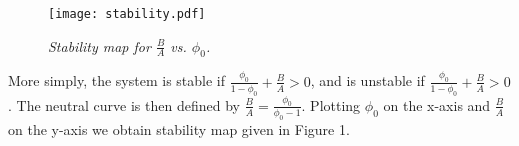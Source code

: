\documentclass[9pt,fleqn,twoside]{article}
\theoremstyle{plain}
\theoremstyle{definition}
\theoremstyle{remark}
\begin{document}
\begin{figure}[!htbp]
\centering
\scalebox{0.5} 
{\texttt{[image: stability.pdf]}} 
\caption{\small {\it Stability map for $\frac{B}{A}$ vs. $\phi_0$.}} 
\end{figure}
More simply, the system is stable if $\frac{\phi_0}{1-\phi_0} +
\frac{B}{A} > 0$, and is unstable if $\frac{\phi_0}{1-\phi_0} +
\frac{B}{A} > 0$. The neutral curve is then defined by $\frac{B}{A} =
\frac{\phi_0}{\phi_0 - 1}$. Plotting $\phi_0$ on the x-axis and
$\frac{B}{A}$ on the y-axis we obtain stability map given in Figure
1. 
\end{document}
